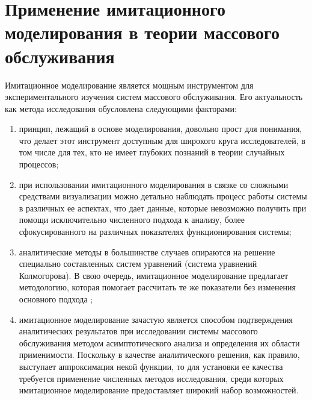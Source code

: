 \section {Применение имитационного моделирования в теории массового обслуживания}
Имитационное моделирование \cite{задорожный2011методы} является мощным инструментом для экспериментального изучения систем массового обслуживания. Его актуальность как метода исследования обусловлена следующими факторами:
\begin{enumerate}
	\item принцип, лежащий в основе моделирования, довольно прост для понимания, что делает этот инструмент доступным для широкого круга исследователей, в том числе для тех, кто не имеет глубоких познаний в теории случайных процессов;
	\item при использовании имитационного моделирования в связке со сложными средствами визуализации можно детально наблюдать процесс работы системы в различных ее аспектах, что дает данные, которые невозможно получить при помощи исключительно численного подхода к анализу, более сфокусированного на различных показателях функционирования системы; 
	\item аналитические методы в большинстве случаев опираются на решение специально составленных систем уравнений (система уравнений Колмогорова). В свою очередь, имитационное моделирование предлагает методологию, которая помогает рассчитать те же показатели без изменения основного подхода \cite{glynn1988simulation};
	\item имитационное моделирование зачастую является способом подтверждения аналитических результатов при исследовании системы массового обслуживания методом асимптотического анализа и определения их области применимости. Поскольку в качестве аналитического решения, как правило, выступает аппроксимация некой функции, то для установки ее качества требуется применение численных методов исследования, среди которых имитационное моделирование предоставляет широкий набор возможностей.
\end{enumerate}

